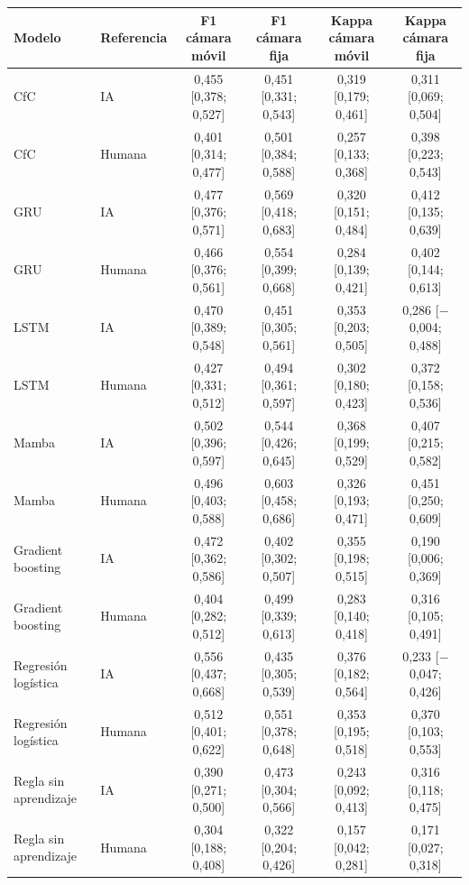 \begin{tabular}{|l|l|c|c|c|c|}
\hline
\textbf{Modelo} & \textbf{Referencia} & \textbf{F1 cámara móvil} & \textbf{F1 cámara fija} & \textbf{Kappa cámara móvil} & \textbf{Kappa cámara fija} \\ \hline
CfC & IA & 0{,}455 [0{,}378; 0{,}527] & 0{,}451 [0{,}331; 0{,}543] & 0{,}319 [0{,}179; 0{,}461] & 0{,}311 [0{,}069; 0{,}504] \\ \hline
CfC & Humana & 0{,}401 [0{,}314; 0{,}477] & 0{,}501 [0{,}384; 0{,}588] & 0{,}257 [0{,}133; 0{,}368] & 0{,}398 [0{,}223; 0{,}543] \\ \hline
GRU & IA & 0{,}477 [0{,}376; 0{,}571] & 0{,}569 [0{,}418; 0{,}683] & 0{,}320 [0{,}151; 0{,}484] & 0{,}412 [0{,}135; 0{,}639] \\ \hline
GRU & Humana & 0{,}466 [0{,}376; 0{,}561] & 0{,}554 [0{,}399; 0{,}668] & 0{,}284 [0{,}139; 0{,}421] & 0{,}402 [0{,}144; 0{,}613] \\ \hline
LSTM & IA & 0{,}470 [0{,}389; 0{,}548] & 0{,}451 [0{,}305; 0{,}561] & 0{,}353 [0{,}203; 0{,}505] & 0{,}286 [$-$0{,}004; 0{,}488] \\ \hline
LSTM & Humana & 0{,}427 [0{,}331; 0{,}512] & 0{,}494 [0{,}361; 0{,}597] & 0{,}302 [0{,}180; 0{,}423] & 0{,}372 [0{,}158; 0{,}536] \\ \hline
Mamba & IA & 0{,}502 [0{,}396; 0{,}597] & 0{,}544 [0{,}426; 0{,}645] & 0{,}368 [0{,}199; 0{,}529] & 0{,}407 [0{,}215; 0{,}582] \\ \hline
Mamba & Humana & 0{,}496 [0{,}403; 0{,}588] & 0{,}603 [0{,}458; 0{,}686] & 0{,}326 [0{,}193; 0{,}471] & 0{,}451 [0{,}250; 0{,}609] \\ \hline
Gradient boosting & IA & 0{,}472 [0{,}362; 0{,}586] & 0{,}402 [0{,}302; 0{,}507] & 0{,}355 [0{,}198; 0{,}515] & 0{,}190 [0{,}006; 0{,}369] \\ \hline
Gradient boosting & Humana & 0{,}404 [0{,}282; 0{,}512] & 0{,}499 [0{,}339; 0{,}613] & 0{,}283 [0{,}140; 0{,}418] & 0{,}316 [0{,}105; 0{,}491] \\ \hline
Regresión logística & IA & 0{,}556 [0{,}437; 0{,}668] & 0{,}435 [0{,}305; 0{,}539] & 0{,}376 [0{,}182; 0{,}564] & 0{,}233 [$-$0{,}047; 0{,}426] \\ \hline
Regresión logística & Humana & 0{,}512 [0{,}401; 0{,}622] & 0{,}551 [0{,}378; 0{,}648] & 0{,}353 [0{,}195; 0{,}518] & 0{,}370 [0{,}103; 0{,}553] \\ \hline
Regla sin aprendizaje & IA & 0{,}390 [0{,}271; 0{,}500] & 0{,}473 [0{,}304; 0{,}566] & 0{,}243 [0{,}092; 0{,}413] & 0{,}316 [0{,}118; 0{,}475] \\ \hline
Regla sin aprendizaje & Humana & 0{,}304 [0{,}188; 0{,}408] & 0{,}322 [0{,}204; 0{,}426] & 0{,}157 [0{,}042; 0{,}281] & 0{,}171 [0{,}027; 0{,}318] \\ \hline
\end{tabular}
